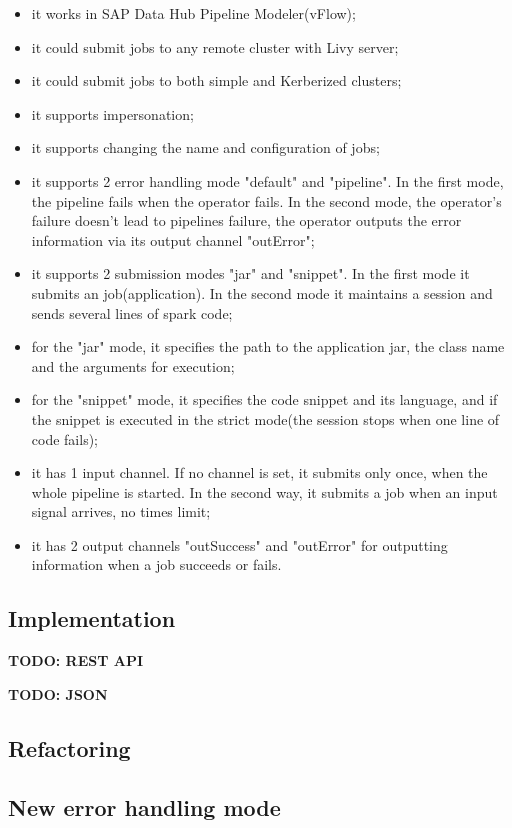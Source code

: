 \documentclass[article,colorback,accentcolor=tud4c]{tudreport}
\begin{document}
	\begin{itemize}
		\item it works in SAP Data Hub Pipeline Modeler(vFlow);
		\item it could submit jobs to any remote cluster with Livy server;
		\item it could submit jobs to both simple and Kerberized clusters;
		\item it supports impersonation;
		\item it supports changing the name and configuration of jobs;
		\item it supports 2 error handling mode "default" and "pipeline". In the first mode, the pipeline fails when the operator fails. In the second mode, the operator's failure doesn't lead to pipelines failure, the operator outputs the error information via its output channel "outError";
		\item it supports 2 submission modes "jar" and "snippet". In the first mode it submits an job(application). In the second mode it maintains a session and sends several lines of spark code;
		\item for the "jar" mode, it specifies the path to the application jar, the class name and the arguments for execution;
		\item for the "snippet" mode, it specifies the code snippet and its language, and if the snippet is executed in the strict mode(the session stops when one line of code fails);
		\item it has 1 input channel. If no channel is set, it submits only once, when the whole pipeline is started. In the second way, it submits a job when an input signal arrives, no times limit;
		\item it has 2 output channels "outSuccess" and "outError" for outputting information when a job succeeds or fails.
	\end{itemize}
	
	\subsection{Implementation}
	\textbf{TODO: REST API}
	
	\textbf{TODO: JSON}
	
	
	\subsection{Refactoring}
	
	\subsection{New error handling mode}
\end{document}
